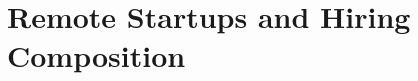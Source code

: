 \documentclass{article}
\begin{document}
\section*{Remote Startups and Hiring Composition}


\end{document}

